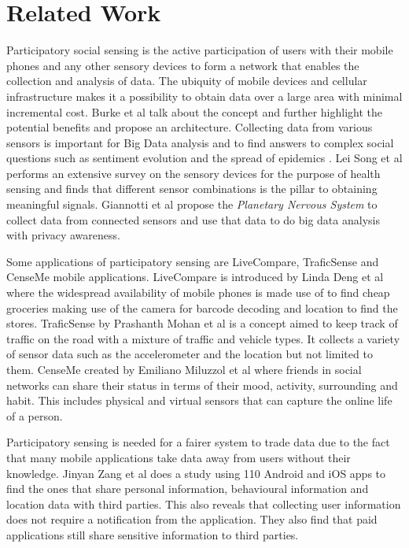 \chapter{Related Work}

Participatory social sensing is the active participation of users with their mobile phones and any other sensory devices to form a network that enables the collection and analysis of data. The ubiquity of mobile devices and cellular infrastructure makes it a possibility to obtain data over a large area with minimal incremental cost. Burke et al talk about the concept \cite{burke2006participatory} and further highlight the potential benefits and propose an architecture. Collecting data from various sensors is important for Big Data analysis and to find answers to complex social questions such as sentiment evolution and the spread of epidemics \cite{giannotti2012planetary}. Lei Song et al \cite{song2014health} performs an extensive survey on the sensory devices for the purpose of health sensing and finds that different sensor combinations is the pillar to obtaining meaningful signals. Giannotti et al \cite{giannotti2012planetary} propose the \textit{Planetary Nervous System} to collect data from connected sensors and use that data to do big data analysis with privacy awareness.

Some applications of participatory sensing are LiveCompare, TraficSense and CenseMe mobile applications. LiveCompare is introduced by Linda Deng et al
\cite{deng2009livecompare} where the widespread availability of mobile phones is made use of to find cheap groceries making use of the camera for barcode decoding and location to find the stores. TraficSense by Prashanth Mohan et al \cite{mohan2008nericell} is a concept aimed to keep track of traffic on the road with a mixture of traffic and vehicle types. It collects a variety of sensor data such as the accelerometer and the location but not limited to them. CenseMe created by Emiliano Miluzzol et al \cite{miluzzo2007cenceme} where friends in social networks can share their status in terms of their mood, activity, surrounding and habit. This includes physical and virtual sensors that can capture the online life of a person. 

Participatory sensing is needed for a fairer system to trade data due to the fact that many mobile applications take data away from users without their knowledge. Jinyan Zang et al
\cite{zang2015knows} does a study using 110 Android and iOS apps to find the ones that share personal information, behavioural information and location data with third parties. This also reveals that collecting user information does not require a notification from the application. They also find that paid applications still share sensitive information to third parties. 

